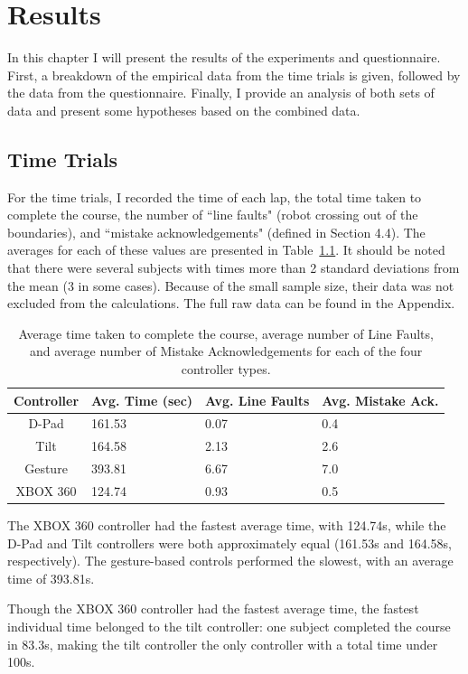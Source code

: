 \documentclass[12pt, letterpaper]{report}
\begin{document}
\chapter{Results}
In this chapter I will present the results of the experiments and questionnaire. First, a breakdown of the empirical data from the time trials is given, followed by the data from the questionnaire. Finally, I provide an analysis of both sets of data and present some hypotheses based on the combined data.

\section{Time Trials}
For the time trials, I recorded the time of each lap, the total time taken to complete the course, the number of ``line faults" (robot crossing out of the boundaries), and ``mistake acknowledgements" (defined in Section 4.4). The averages for each of these values are presented in Table~\ref{averages}. It should be noted that there were several subjects with times more than 2 standard deviations from the mean (3 in some cases). Because of the small sample size, their data was not excluded from the calculations. The full raw data can be found in the Appendix.

\begin{table}[h]
	\begin{tabular}{|c||l|l|l|}
	\hline 
	Controller & Avg. Time (sec) & Avg. Line Faults & Avg. Mistake Ack. \\ 
	\hline 
	D-Pad & 161.53 & 0.07 & 0.4 \\ 
	\hline 
	Tilt & 164.58 & 2.13 & 2.6 \\ 
	\hline 
	Gesture & 393.81 & 6.67 & 7.0 \\ 
	\hline 
	XBOX 360 & 124.74 & 0.93 & 0.5 \\ 
	\hline 
	\end{tabular} 
	\caption{Average time taken to complete the course, average number of Line Faults, and average number of Mistake Acknowledgements for each of the four controller types.}
	\label{averages}
\end{table}

The XBOX 360 controller had the fastest average time, with 124.74s, while the D-Pad and Tilt controllers were both approximately equal (161.53s and 164.58s, respectively). The gesture-based controls performed the slowest, with an average time of 393.81s.

Though the XBOX 360 controller had the fastest average time, the fastest individual time belonged to the tilt controller: one subject completed the course in 83.3s, making the tilt controller the only controller with a total time under 100s.
\end{document}
